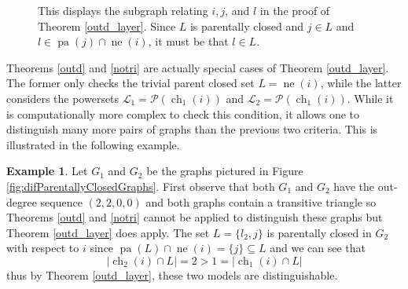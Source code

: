 \documentclass[12pt,reqno]{amsart}
\theoremstyle{plain}
\theoremstyle{definition}
\newtheorem{example}[theorem]{Example}
\DeclareMathOperator{\pa}{pa}
\DeclareMathOperator{\ch}{ch}
\DeclareMathOperator{\neighbors}{ne}
\begin{document}
\begin{figure}
\centering
{}
\caption{This displays the subgraph relating $i, j$, and $l$ in the proof of Theorem \ref{outd_layer}. Since $L$ is parentally closed and $j \in L$ and $l \in \pa(j) \cap \neighbors(i)$, it must be that $l \in L$. }
\label{fig:parentallyClosedSetProof}
\end{figure}


Theorems \ref{outd} and \ref{notri} are actually special cases of Theorem \ref{outd_layer}. The former only checks the trivial parent closed set $L= \neighbors(i)$, while the latter considers the powersets $\mathcal{L}_1= \mathcal{P}(\ch_1(i))$ and $\mathcal{L}_2=\mathcal{P}(\ch_1(i))$. While it is computationally more complex to check this condition, it allows one to distinguish many more pairs of graphs than the previous two criteria. This is illustrated in the following example. 

\begin{example}
Let $G_1$ and $G_2$ be the graphs pictured in Figure \ref{fig:difParentallyClosedGraphs}. First observe that both $G_1$ and $G_2$ have the out-degree sequence $(2,2,0,0)$ and both graphs contain a transitive triangle so Theorems \ref{outd} and \ref{notri} cannot be applied to distinguish these graphs but Theorem \ref{outd_layer} does apply. 
The set $L = \{l_2, j\}$ is parentally closed in $G_2$ with respect to $i$ since $\pa(L) \cap \neighbors(i) = \{j\} \subseteq L$ and we can see that
\[
|\ch_2(i) \cap L| = 2 > 1 = |\ch_1(i) \cap L|
\]
thus by Theorem \ref{outd_layer}, these two models are distinguishable. 
\end{example}
\end{document}

